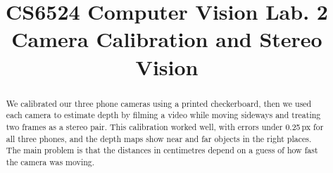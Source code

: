 \documentclass[conference]{assets/latex/IEEEtran}
\begin{document}
\title{CS6524 Computer Vision Lab. 2\\ Camera Calibration and Stereo Vision}

\author{
\and
{}
\and
{}
}

\maketitle

\begin{abstract}
We calibrated our three phone cameras using a printed checkerboard, then we used each camera to estimate
depth by filming a video while moving sideways and treating two frames as a stereo pair. 
This calibration worked well, with errors under 0.25\,px for all three phones, and the depth maps show
near and far objects in the right places. The main problem is that the distances in centimetres
depend on a guess of how fast the camera was moving.
\end{abstract}






\printbibliography
\end{document}
